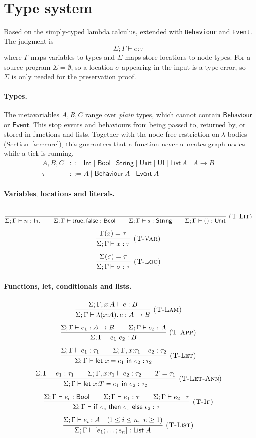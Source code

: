 \documentclass{article}
\makeatletter
\newcommand{\kw}[1]{\mathsf{#1}}
\newcommand{\rul}[3]{\[\dfrac{\begin{array}{@{}c@{}}#2\end{array}}{\begin{array}{@{}c@{}}#3\end{array}}\ \textsc{#1}\]}
\newcommand{\tj}{\Sigma;\Gamma \vdash}   %
\makeatother
\begin{document}
\section{Type system}

Based on the simply-typed lambda calculus, extended with \texttt{Behaviour} and \texttt{Event}.
The judgment is
\[ \Sigma;\Gamma \vdash e : \tau \]
where $\Gamma$ maps variables to types and $\Sigma$ maps store locations to node types.
For a source program $\Sigma = \emptyset$, so a location $\sigma$ appearing in the input is a type error, so
$\Sigma$ is only needed for the preservation proof.

\paragraph{Types.} The metavariables $A, B, C$ range over \emph{plain} types, which cannot contain
$\kw{Behaviour}$ or $\kw{Event}$. This stop events and behaviours from being passed to, returned by, or stored in functions and lists. Together with the node-free restriction on $\lambda$-bodies (Section~\ref{sec:core}), this guarantees that a function never allocates graph nodes while a tick is running.
\begin{align*}
A, B, C &::= \kw{Int} \mid \kw{Bool} \mid \kw{String} \mid \kw{Unit} \mid \kw{UI} \mid \kw{List}\ A \mid A \to B\\
\tau &::= A \mid \kw{Behaviour}\ A \mid \kw{Event}\ A
\end{align*}

\paragraph{Variables, locations and literals.}
\rul{(T-Lit)}{\ }{\tj n : \kw{Int} \qquad \tj \kw{true},\kw{false} : \kw{Bool} \qquad \tj s : \kw{String} \qquad \tj () : \kw{Unit}}
\rul{(T-Var)}{\Gamma(x) = \tau}{\tj x : \tau}
\rul{(T-Loc)}{\Sigma(\sigma) = \tau}{\tj \sigma : \tau}

\paragraph{Functions, let, conditionals and lists.}
\rul{(T-Lam)}{\Sigma;\Gamma, x{:}A \vdash e : B}{\tj \lambda(x{:}A).\,e : A \to B}
\rul{(T-App)}{\tj e_1 : A \to B \qquad \tj e_2 : A}{\tj e_1\ e_2 : B}
\rul{(T-Let)}{\tj e_1 : \tau_1 \qquad \Sigma;\Gamma, x{:}\tau_1 \vdash e_2 : \tau_2}{\tj \kw{let}\ x = e_1\ \kw{in}\ e_2 : \tau_2}
\rul{(T-Let-Ann)}{\tj e_1 : \tau_1 \qquad \Sigma;\Gamma, x{:}\tau_1 \vdash e_2 : \tau_2 \qquad T = \tau_1}
{\tj \kw{let}\ x{:}T = e_1\ \kw{in}\ e_2 : \tau_2}
\rul{(T-If)}{\tj e_c : \kw{Bool} \qquad \tj e_1 : \tau \qquad \tj e_2 : \tau}
{\tj \kw{if}\ e_c\ \kw{then}\ e_1\ \kw{else}\ e_2 : \tau}
\rul{(T-List)}{\tj e_i : A \quad (1 \le i \le n,\ n \ge 1)}{\tj [e_1;\dots;e_n] : \kw{List}\ A}
\end{document}
